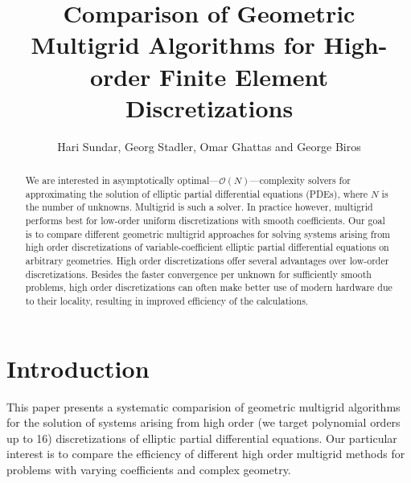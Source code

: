 \documentclass[smallcondensed,final]{svjour3}     %
\begin{document}

\title{Comparison of Geometric Multigrid Algorithms for High-order Finite Element Discretizations}

\author{Hari Sundar, Georg Stadler, Omar Ghattas and George Biros}


\maketitle

\begin{abstract}
We are interested in asymptotically
optimal---$\mathcal{O}(N)$---complexity solvers for approximating the
solution of elliptic partial differential equations (PDEs), where $N$
is the number of unknowns.  Multigrid is such a solver. In practice
however, multigrid performs best for low-order uniform discretizations
with smooth coefficients.
%
Our goal is to compare different geometric multigrid approaches for
solving systems arising from high order discretizations of
variable-coefficient elliptic partial differential equations on
arbitrary geometries. High order discretizations offer several
advantages over low-order discretizations. Besides the faster
convergence per unknown for sufficiently smooth problems, high order
discretizations can often make better use of modern hardware due to
their locality, resulting in improved efficiency of the calculations.
\end{abstract}




\section{Introduction}

This paper presents a systematic comparision of geometric multigrid
algorithms for the solution of systems arising from high order (we
target polynomial orders up to 16) discretizations of elliptic partial
differential equations. Our particular interest is to compare the
efficiency of different high order multigrid methods for problems with
varying coefficients and complex geometry.
\end{document}
